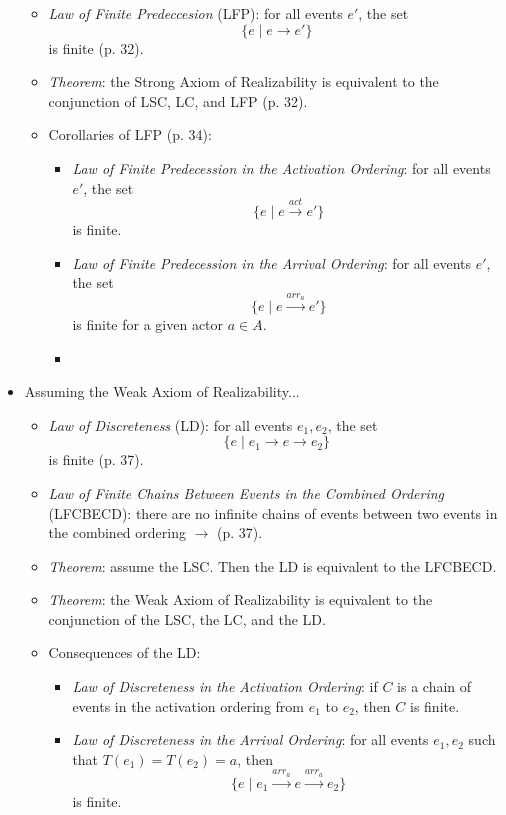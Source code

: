 \begin{itemize}
\begin{itemize}
	\item \emph{Law of Finite Predeccesion} (LFP): for all events $e'$, the set
		\begin{equation*}
			\{e \mid e \rightarrow e'\}
		\end{equation*}
	is finite (p. 32).
	\item \emph{Theorem}: the Strong Axiom of Realizability is equivalent to the conjunction of LSC, LC, and LFP (p. 32).
	\item Corollaries of LFP (p. 34):
		\begin{itemize}
		\item \emph{Law of Finite Predecession in the Activation Ordering}: for all events $e'$, the set
			\begin{equation*}
				\{e \mid e \overset{act}{\longrightarrow} e'\}
			\end{equation*}
		is finite.
		\item \emph{Law of Finite Predecession in the Arrival Ordering}: for all events $e'$, the set
			\begin{equation*}
				\{e \mid e \overset{arr_a}{\longrightarrow} e'\}
			\end{equation*}
		is finite for a given actor $a \in A$.
		\item
		\end{itemize}
	\end{itemize}
\item Assuming the Weak Axiom of Realizability...
	\begin{itemize}
	\item \emph{Law of Discreteness} (LD): for all events $e_1, e_2$, the set
		\begin{equation*}
			\{e \mid e_1 \rightarrow e \rightarrow e_2\}
		\end{equation*}
	is finite (p. 37).
	\item \emph{Law of Finite Chains Between Events in the Combined Ordering} (LFCBECD): there are no infinite chains of events between two events in the combined ordering $\rightarrow$ (p. 37).
	\item \emph{Theorem}: assume the LSC. Then the LD is equivalent to the LFCBECD.
	\item \emph{Theorem}: the Weak Axiom of Realizability is equivalent to the conjunction of the LSC, the LC, and the LD.
	\item Consequences of the LD:
		\begin{itemize}
		\item \emph{Law of Discreteness in the Activation Ordering}: if $C$ is a chain of events in the activation ordering from $e_1$ to $e_2$, then $C$ is finite.
		\item \emph{Law of Discreteness in the Arrival Ordering}: for all events $e_1, e_2$ such that $T(e_1) = T(e_2) = a$, then
			\begin{equation*}
			\{e \mid e_1 \overset{arr_a}{\longrightarrow} e \overset{arr_a}{\longrightarrow} e_2\}
			\end{equation*}
		is finite.
		\end{itemize}
	\end{itemize}
\end{itemize}

